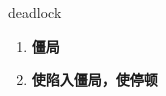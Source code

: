 
\begin{frame}
{\huge deadlock}
\begin{center}
\begin{enumerate}\Large
  \item \textbf{僵局}
  \item \textbf{使陷入僵局，使停顿}
\end{enumerate}
\end{center}
\end{frame}
